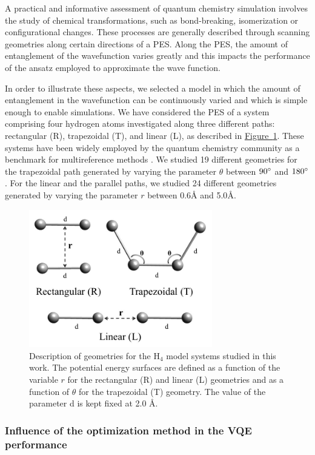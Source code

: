 \documentclass[superscriptaddress,aps,pra,twocolumn,nofootinbib,babel]{revtex4-1}
\newcommand{\fig}[1]{\hyperref[fig:#1]{Figure~\ref*{fig:#1}}}
\begin{document}
A practical and informative assessment of quantum chemistry simulation involves the study of chemical transformations, such as bond-breaking, isomerization or configurational changes. These processes are generally described through scanning geometries along certain directions of a PES. Along the PES, the amount of entanglement of the wavefunction varies greatly and this impacts the performance of the ansatz employed to approximate the wave function. 

In order to illustrate these aspects, we selected a model in which the amount of entanglement in the wavefunction can be continuously varied and which is simple enough to enable simulations. We have considered the PES of a system comprising four hydrogen atoms investigated along three different paths: rectangular (R), trapezoidal (T), and linear (L), as described in \fig{H4models}. These systems have been widely employed by the quantum chemistry community as a benchmark for multireference methods  \cite{jankowski.IJQC.18.1242.1980,Lyakh.CR.112.182.2011}. We studied 19 different geometries for the trapezoidal path generated by varying the parameter $\theta$ between $90\degree$ and $180\degree$. For the linear and the parallel paths, we studied 24 different geometries generated by varying the parameter $r$ between 0.6{\AA} and 5.0{\AA}.

\begin{figure}
\centering
\includegraphics[width=8cm]{figures/H4models.jpg}
\caption{Description of geometries for the H$_4$ model systems studied in this work. The potential energy surfaces are defined as a function of the variable $r$ for the rectangular (R) and linear (L) geometries and as a function of $\theta$ for the trapezoidal (T) geometry. The value of the parameter d is kept fixed at 2.0 \AA.}\label{fig:H4models}
\end{figure}

\subsubsection{Influence of the optimization method in the VQE performance}
\end{document}
